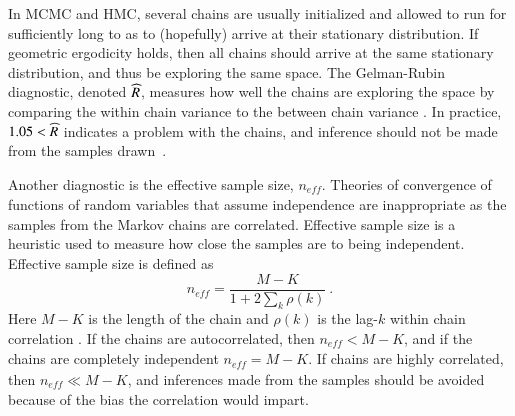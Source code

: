In MCMC and HMC, several chains are usually initialized and allowed to run for sufficiently long to as to (hopefully) arrive at their stationary distribution.  If geometric ergodicity holds, then all chains should arrive at the same stationary distribution, and thus be exploring the same space.  The Gelman-Rubin diagnostic, denoted $\widehat{R}$,  measures how well the chains are exploring the space by comparing the within chain variance to the between chain variance \cite{gelman2013bayesian}.  In practice, $ 1.05<\widehat{R} $ indicates a problem with the chains, and inference should not be made from the samples drawn~\cite{betancourt2017robust}.

Another diagnostic is the effective sample size, $ n_{\mathit{eff}} $.  Theories of convergence of functions of random variables that assume independence are inappropriate as the samples from the Markov chains are correlated.  Effective sample size is a heuristic used to measure how close the samples are to being independent.  Effective sample size is defined as
%
\[ n_{\mathit{eff}} = \dfrac{M-K}{1+ 2\displaystyle\sum_k \rho(k)} \>. \]
%
Here $ M-K $ is the length of the chain and $ \rho(k) $ is the lag-$k$ within chain correlation \cite{gelman2013bayesian,kass1998markov}.  If the chains are autocorrelated, then $n_{\mathit{eff}} <M-K$, and if the chains are completely independent $n_{\mathit{eff}} = M-K$. If chains are highly correlated, then $n_{\mathit{eff}} \ll M-K$, and inferences made from the samples should be avoided because of the bias the correlation would impart.